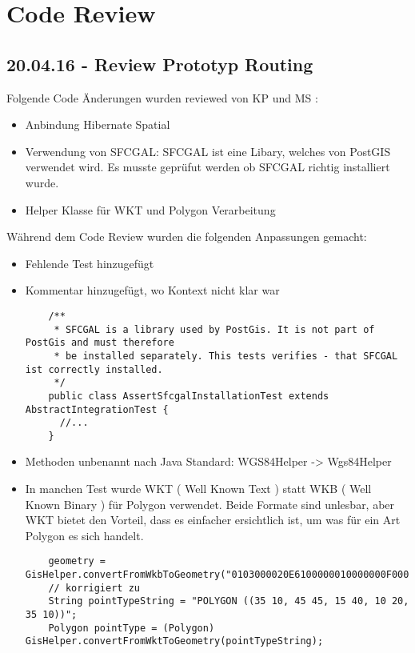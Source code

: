 \newpage
\chapter{Code Review}

\section{20.04.16 - Review Prototyp Routing}
Folgende Code Änderungen wurden reviewed von KP und MS :
\begin{itemize}
	\item{Anbindung Hibernate Spatial}
	\item{Verwendung von SFCGAL: SFCGAL ist eine Libary, welches von PostGIS verwendet wird. Es musste geprüfut werden ob SFCGAL richtig installiert wurde.}
	\item{Helper Klasse für WKT und Polygon Verarbeitung}
\end{itemize}

Während dem Code Review wurden die folgenden Anpassungen gemacht:
\begin{itemize}
	\item{Fehlende Test hinzugefügt}
	\item{Kommentar hinzugefügt, wo Kontext nicht klar war}
	\begin{lstlisting}
	/**
     * SFCGAL is a library used by PostGis. It is not part of PostGis and must therefore
     * be installed separately. This tests verifies - that SFCGAL ist correctly installed.
     */
    public class AssertSfcgalInstallationTest extends AbstractIntegrationTest {
      //...
    }
	\end{lstlisting}
	\item{Methoden unbenannt nach Java Standard: WGS84Helper -> Wgs84Helper }
	\item{In manchen Test wurde WKT ( Well Known Text ) statt WKB ( Well Known Binary ) für Polygon verwendet. Beide Formate sind unlesbar, aber WKT bietet den Vorteil, dass es einfacher ersichtlich ist, um was für ein Art Polygon es sich handelt.}
	\begin{lstlisting}
    geometry = GisHelper.convertFromWkbToGeometry("0103000020E6100000010000000F000000FFBE7D4109A2214002A052D59E9E9C4740");
    // korrigiert zu
    String pointTypeString = "POLYGON ((35 10, 45 45, 15 40, 10 20, 35 10))";
    Polygon pointType = (Polygon) GisHelper.convertFromWktToGeometry(pointTypeString);
	\end{lstlisting}
\end{itemize}
\newpage


